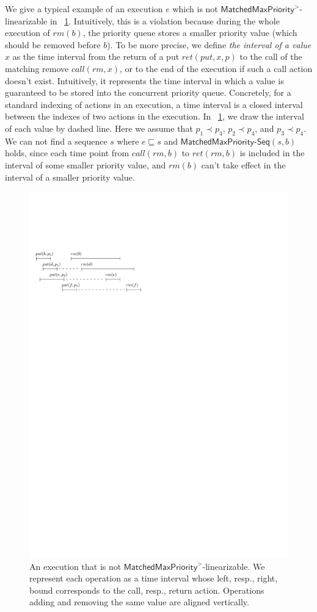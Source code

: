 We give a typical example of an execution $e$ which is not $\mathsf{MatchedMaxPriority}^>$-linearizable in
\figurename~\ref{fig:introduce gap for EPQ1Lar}. Intuitively, this is a violation because during the whole execution of $\textit{rm}(b)$, the priority queue stores a smaller priority value (which should be removed before $b$). To be more precise, we define \emph{the interval of a value $x$} as the time interval from the return of a put $\textit{ret}(\textit{put},x,p)$ to the call of the matching remove $\textit{call}(rm,x)$, or to the end of the execution if such a call action doesn't exist. Intuitively, it represents the time interval in which a value is guaranteed to be stored into the concurrent priority queue. Concretely, for a standard indexing of actions in an execution, a time interval is a closed interval between the indexes of two actions in the execution.
In \figurename~\ref{fig:introduce gap for EPQ1Lar}, we draw the interval of each value by dashed line. Here we assume that $p_1 \prec p_4$, $p_2 \prec p_4$, and $p_3 \prec p_4$. We can not find a sequence $s$ where $e \sqsubseteq s$ and $\mathsf{MatchedMaxPriority}\mathsf{\text{-}Seq}(s,b)$ holds, since each time point from $\textit{call}(\textit{rm},b)$ to $\textit{ret}(\textit{rm},b)$ is included in the interval of some smaller priority value, and $\textit{rm}(b)$ can't take effect in the interval of a smaller priority value.

\begin{figure}[htbp]
  \centering
  \includegraphics[width=0.4 \textwidth]{figures/PIC-HIS-INTRO-GAP-EPQ1L.pdf}
  \caption{An execution that is not $\mathsf{MatchedMaxPriority}^{>}$-linearizable. We represent each operation as a time interval whose left, resp., right, bound corresponds to the call, resp., return action. {\color {blue}Operations adding and removing the same value are aligned vertically.}}
  \label{fig:introduce gap for EPQ1Lar}
\end{figure}

